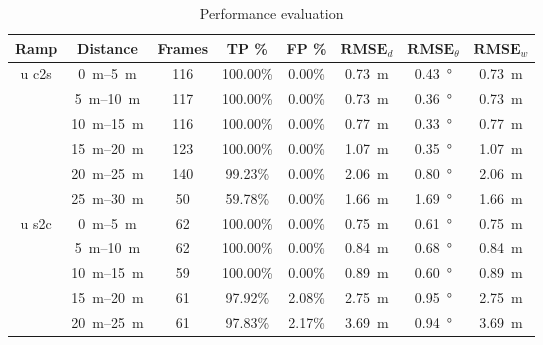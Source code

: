 \begin{table}[htbp]
	\centering
	\caption{Performance evaluation}
	\label{tab:eval_table_lidar}
	\begin{tabular}[t]{cccccccc}
		\toprule
		\textbf{Ramp}          & \textbf{Distance}        & \textbf{Frames} & \textbf{TP \%} & \textbf{FP \%} & $\textbf{RMSE}_d$  & $\textbf{RMSE}_\theta$ & $\textbf{RMSE}_w$  \\
		\midrule
		\multirow{6}{*}{u c2s} & \SIrange{0}{5}{\metre}   & 116             & 100.00\%       & 0.00\%         & \SI{0.73}{\metre}  & \SI{0.43}{\degree}     & \SI{0.73}{\metre}  \\
		                       & \SIrange{5}{10}{\metre}  & 117             & 100.00\%       & 0.00\%         & \SI{0.73}{\metre}  & \SI{0.36}{\degree}     & \SI{0.73}{\metre}  \\
		                       & \SIrange{10}{15}{\metre} & 116             & 100.00\%       & 0.00\%         & \SI{0.77}{\metre}  & \SI{0.33}{\degree}     & \SI{0.77}{\metre}  \\
		                       & \SIrange{15}{20}{\metre} & 123             & 100.00\%       & 0.00\%         & \SI{1.07}{\metre}  & \SI{0.35}{\degree}     & \SI{1.07}{\metre}  \\
		                       & \SIrange{20}{25}{\metre} & 140             & 99.23\%        & 0.00\%         & \SI{2.06}{\metre}  & \SI{0.80}{\degree}     & \SI{2.06}{\metre}  \\
		                       & \SIrange{25}{30}{\metre} & 50              & 59.78\%        & 0.00\%         & \SI{1.66}{\metre}  & \SI{1.69}{\degree}     & \SI{1.66}{\metre}  \\
		\hline
		\multirow{6}{*}{u s2c} & \SIrange{0}{5}{\metre}   & 62              & 100.00\%       & 0.00\%         & \SI{0.75}{\metre}  & \SI{0.61}{\degree}     & \SI{0.75}{\metre}  \\
		                       & \SIrange{5}{10}{\metre}  & 62              & 100.00\%       & 0.00\%         & \SI{0.84}{\metre}  & \SI{0.68}{\degree}     & \SI{0.84}{\metre}  \\
		                       & \SIrange{10}{15}{\metre} & 59              & 100.00\%       & 0.00\%         & \SI{0.89}{\metre}  & \SI{0.60}{\degree}     & \SI{0.89}{\metre}  \\
		                       & \SIrange{15}{20}{\metre} & 61              & 97.92\%        & 2.08\%         & \SI{2.75}{\metre}  & \SI{0.95}{\degree}     & \SI{2.75}{\metre}  \\
		                       & \SIrange{20}{25}{\metre} & 61              & 97.83\%        & 2.17\%         & \SI{3.69}{\metre}  & \SI{0.94}{\degree}     & \SI{3.69}{\metre}  \\

\end{tabular}
\end{table}
